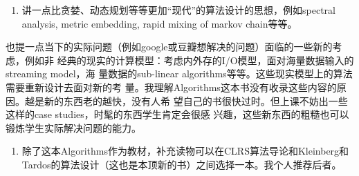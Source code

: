 \documentclass[11pt]{article}
\begin{document}
\begin{enumerate}
\item 讲一点比贪婪、动态规划等等更加“现代”的算法设计的思想，例如spectral analysis, metric embedding, rapid mixing of markov chain等等。
\end{enumerate}
也提一点当下的实际问题（例如google或豆瓣想解决的问题）面临的一些新的考虑，例如非
经典的现实的计算模型：考虑内外存的I/O模型，面对海量数据输入的streaming model，海
量数据的sub-linear algorithms等等。这些现实模型上的算法需要重新设计去面对新的考
量。我理解Algorithms这本书没有收录这些内容的原因。越是新的东西老的越快，没有人希
望自己的书很快过时。但上课不妨出一些这样的case studies，时髦的东西学生肯定会很感
兴趣，这些新东西的粗糙也可以锻炼学生实际解决问题的能力。

\begin{enumerate}
\item 除了这本Algorithms作为教材，补充读物可以在CLRS算法导论和Kleinberg和Tardos的算法设计（这也是本顶新的书）之间选择一本。我个人推荐后者。
\end{enumerate}
\end{document}
